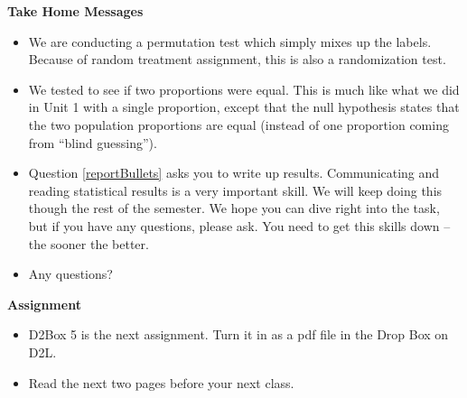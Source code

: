 \begin{center}
  {\bf Take Home Messages}
\end{center}
  \begin{itemize}
  \item We are conducting a permutation test which simply mixes up the
    labels.  Because of random treatment assignment, this is also a
    randomization test. 
  \item We tested to see if  two proportions were
    equal. This is much like what we did in Unit 1 with a single
    proportion, except that the null hypothesis states that the two
    population proportions are equal (instead of one proportion coming
    from ``blind guessing'').
  \item Question \ref{reportBullets} asks you to write up results.
    Communicating 
    and reading statistical results is a very important skill.  We
    will keep doing this though the rest of the semester.  We hope you
    can dive right into the task, but if you have any questions,
    please ask.  You need to get this skills down -- the sooner the
    better. 
 \item 
 Any questions?\vfill
  \end{itemize}





\noindent
{\bf Assignment} \vspace{-.2in}
\begin{itemize}
\item D2Box 5 is the next assignment.
    Turn it in as a pdf file in the Drop Box on D2L.
  \item Read the next two pages before your next class.
\end{itemize}


